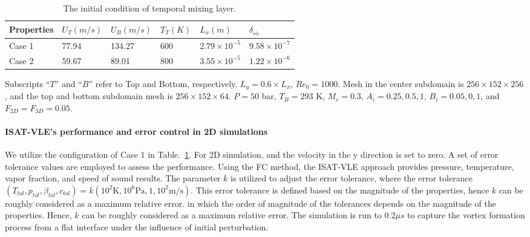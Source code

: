 \begin{center}
	\begin{table}
		\caption{The initial condition of temporal mixing layer.}\label{TML_init_table}
		\begin{threeparttable}
			\begin{tabular*}{0.9\textwidth}{@{} l|lllll@{}}
				\toprule
				Properties     & $U_T (m/s)$   & $U_B (m/s)$  & $T_T (K)$   & $L_x (m)$ & $\delta_{\omega_0}$\\
				\midrule
				Case 1         & 77.94         & 134.27       & 600         & $2.79 \times 10^{-5}$   & $9.58 \times 10^{-7}$   \\
				Case 2         & 59.67         & 89.01        & 800         & $3.55 \times 10^{-5}$   & $1.22\times 10^{-6}$    \\
				\bottomrule
			\end{tabular*}
			\begin{tablenotes}
				\footnotesize
				\item Subscripts ``$T$'' and ``$B$'' refer to Top and Bottom, respectively. $L_y = 0.6\times L_x$,  $Re_0=1000$. Mesh in the center subdomain is $256\times 152 \times 256$, and the top and bottom subdomain mesh is $256\times 152\times 64$. $P = 50$ bar, $T_B=293$ K, $M_c = 0.3$, $A_i = 0.25, 0.5, 1$, $B_i = 0.05, 0, 1$, and $F_{2D}= F_{3D} = 0.05$.\\
			\end{tablenotes}
		\end{threeparttable}
	\end{table}
\end{center}



\paragraph{ISAT-VLE's performance and error control in 2D simulations}

We utilize the configuration of Case 1 in Table.~\ref{TML_init_table}. For 2D simulation, and the velocity in the y direction is set to zero. A set of error tolerance values are employed to assess the performance.  Using the FC method, the ISAT-VLE approach provides pressure, temperature, vapor fraction, and speed of sound results. The parameter $k$ is utilized to adjust the error tolerance, where the error tolerance $(T_{tol},p_{tol},\beta_{tol},c_{tol})= k (10^2 \text{K}, 10^6 \text{Pa}, 1, 10^2 \text{m/s})$. This error tolerance is defined based on the magnitude of the properties, hence $k$ can be roughly considered as a maximum relative error. in which the order of magnitude of the tolerances depends on the magnitude of the properties. Hence, $k$ can be roughly considered as a maximum relative error. The simulation is run to $0.2 \mu s$ to capture the vortex formation process from a flat interface under the influence of initial perturbation.

